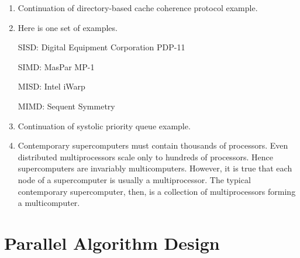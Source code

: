 \begin{enumerate}
\item Continuation of directory-based cache coherence protocol example.
      \begin{center}
      \end{center}

\item Here is one set of examples.

      SISD: Digital Equipment Corporation PDP-11

      SIMD: MasPar MP-1

      MISD: Intel iWarp

      MIMD: Sequent Symmetry

\item Continuation of systolic priority queue example.

      \begin{center}
      \end{center}

\item Contemporary supercomputers must contain thousands of processors.
      Even distributed multiprocessors scale only to hundreds of processors.
      Hence supercomputers are invariably multicomputers. However, it is
      true that each node of a supercomputer is usually a multiprocessor.
      The typical contemporary supercomputer, then, is a collection of
      multiprocessors forming a multicomputer.
\end{enumerate}

\chapter{Parallel Algorithm Design}

